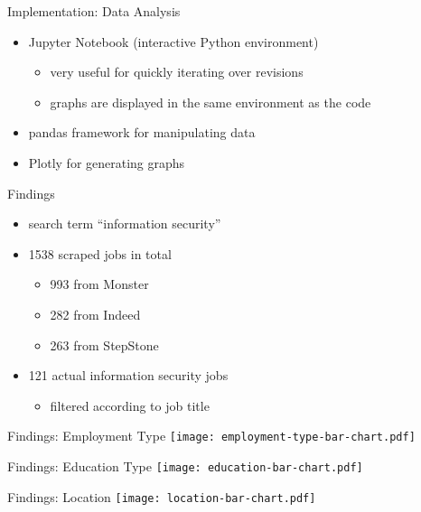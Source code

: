 \documentclass[aspectratio=169]{beamer}
\begin{document}
  \begin{frame}{Implementation: Data Analysis}
    \begin{itemize}
      \item Jupyter Notebook (interactive Python environment)
        \begin{itemize}
          \item very useful for quickly iterating over revisions
          \item graphs are displayed in the same environment as the code
        \end{itemize}
      \item pandas framework for manipulating data
      \item Plotly for generating graphs
    \end{itemize}
  \end{frame}

  \begin{frame}{Findings}
    \begin{itemize}
      \item search term “information security”
      \item 1538 scraped jobs in total
      \begin{itemize}
        \item 993 from Monster
        \item 282 from Indeed
        \item 263 from StepStone
      \end{itemize}
      \item 121 actual information security jobs
        \begin{itemize}
          \item filtered according to job title
        \end{itemize}
    \end{itemize}
  \end{frame}

  \begin{frame}{Findings: Employment Type}
    \texttt{[image: employment-type-bar-chart.pdf]}
  \end{frame}

  \begin{frame}{Findings: Education Type}
    \texttt{[image: education-bar-chart.pdf]}
  \end{frame}

  \begin{frame}{Findings: Location}
    \texttt{[image: location-bar-chart.pdf]}
  \end{frame}
\end{document}
